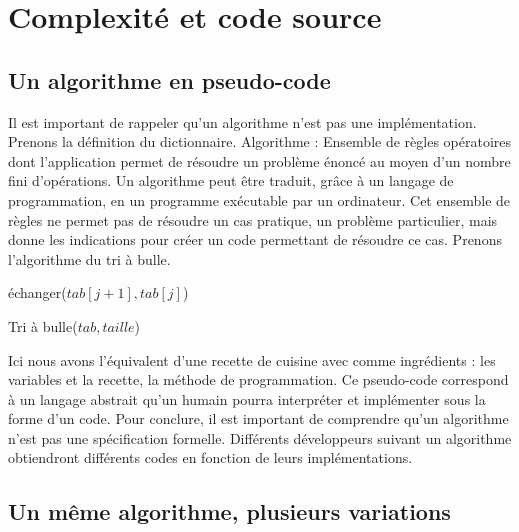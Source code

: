 \documentclass[12pt, twoside, openright]{report}
\begin{document}
\chapter{Complexité et code source}

\section{Un algorithme en pseudo-code}

Il est important de rappeler qu'un algorithme n'est pas une implémentation. Prenons la définition du dictionnaire. Algorithme : Ensemble de règles opératoires dont l'application permet de résoudre un problème énoncé au moyen d'un nombre fini d'opérations. Un algorithme peut être traduit, grâce à un langage de programmation, en un programme exécutable par un ordinateur.\cite{algorithme01} Cet ensemble de règles ne permet pas de résoudre un cas pratique, un problème particulier, mais donne les indications pour créer un code permettant de résoudre ce cas. Prenons l'algorithme du tri à bulle. 

\vspace{0.4cm}

\begin{algorithm}[H]
    
    
    {
        {
            {
                échanger($tab[j+1], tab[j]$)
            }
        }
    }
    \caption{Tri à bulle($tab, taille$)}
\end{algorithm}
 \vspace{0.4cm}
Ici nous avons l'équivalent d'une recette de cuisine avec comme ingrédients : les variables et la recette, la méthode de programmation. Ce pseudo-code correspond à un langage abstrait qu'un humain pourra interpréter et implémenter sous la forme d'un code. Pour conclure, il est important de comprendre qu'un algorithme n'est pas une spécification formelle. Différents développeurs suivant un algorithme obtiendront différents codes en fonction de leurs implémentations.

\section{Un même algorithme, plusieurs variations}
\end{document}
